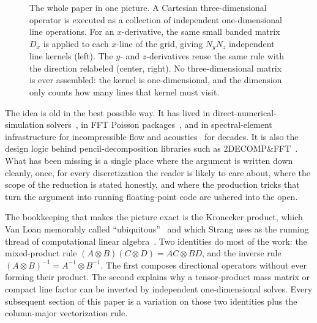 \documentclass[11pt]{article}
\newcommand{\kron}{\otimes}
\begin{document}
\begin{figure}[t]
{}
  \caption{The whole paper in one picture.  A Cartesian three-dimensional
  operator is executed as a collection of independent one-dimensional
  line operations.  For an $x$-derivative, the same small banded matrix
  $D_x$ is applied to each $x$-line of the grid, giving $N_y N_z$
  independent line kernels (left).  The $y$- and $z$-derivatives reuse
  the same rule with the direction relabeled (center, right).  No
  three-dimensional matrix is ever assembled: the kernel is
  one-dimensional, and the dimension only counts how many lines that
  kernel must visit.}
  \label{fig:hero-sweep}
\end{figure}

The idea is old in the best possible way.  It has lived in
direct-numerical-simulation
solvers~\citep{bewley2001dns,kim1985application}, in FFT
Poisson packages~\citep{costa2018fft}, and in spectral-element
infrastructure for incompressible flow and
acoustics~\citep{deville2002high} for decades.  It is also the design
logic behind pencil-decomposition libraries such as
2DECOMP\&FFT~\citep{li2010decomp,rolfo2023decomp}.  What has been
missing is a single place where the argument is written down cleanly,
once, for every discretization the reader is likely to care about,
where the scope of the reduction is stated honestly, and where the
production tricks that turn the argument into running floating-point
code are ushered into the open.

The bookkeeping that makes the picture exact is the Kronecker
product, which Van Loan memorably called
``ubiquitous''~\citep{loan2000ubiquitous} and which Strang uses as
the running thread of computational linear
algebra~\citep{strang2007computational}.  Two identities do most of
the work: the mixed-product rule $(A \kron B)(C \kron D) = AC \kron BD$,
and the inverse rule $(A \kron B)^{-1} = A^{-1} \kron B^{-1}$.  The
first composes directional operators without ever forming their
product.  The second explains why a tensor-product mass matrix or
compact line factor can be inverted by independent one-dimensional
solves.  Every subsequent section of this paper is a variation on
those two identities plus the column-major vectorization rule.
\end{document}
